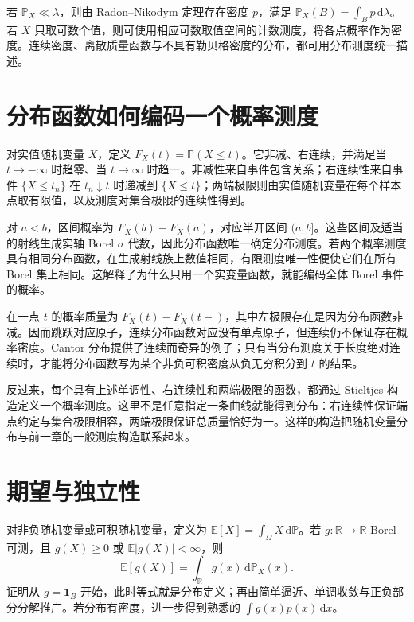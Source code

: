 \documentclass[UTF8,12pt,a4paper,fontset=fandol]{ctexbook}
\begin{document}
若 $\mathbb P_X\ll\lambda$，则由 Radon--Nikodym 定理存在密度 $p$，满足 $\mathbb P_X(B)=\int_Bp\,\mathrm d\lambda$。若 $X$ 只取可数个值，则可使用相应可数取值空间的计数测度，将各点概率作为密度。连续密度、离散质量函数与不具有勒贝格密度的分布，都可用分布测度统一描述。

\section{分布函数如何编码一个概率测度}
对实值随机变量 $X$，定义
$F_X(t)=\mathbb P(X\leq t)$。它非减、右连续，并满足当 $t\to-\infty$ 时趋零、当 $t\to\infty$ 时趋一。非减性来自事件包含关系；右连续性来自事件 $\{X\leq t_n\}$ 在 $t_n\downarrow t$ 时递减到 $\{X\leq t\}$；两端极限则由实值随机变量在每个样本点取有限值，以及测度对集合极限的连续性得到。

对 $a<b$，区间概率为 $F_X(b)-F_X(a)$，对应半开区间 $(a,b]$。这些区间及适当的射线生成实轴 Borel $\sigma$ 代数，因此分布函数唯一确定分布测度。若两个概率测度具有相同分布函数，在生成射线族上数值相同，有限测度唯一性便使它们在所有 Borel 集上相同。这解释了为什么只用一个实变量函数，就能编码全体 Borel 事件的概率。

在一点 $t$ 的概率质量为 $F_X(t)-F_X(t-)$，其中左极限存在是因为分布函数非减。因而跳跃对应原子，连续分布函数对应没有单点原子，但连续仍不保证存在概率密度。Cantor 分布提供了连续而奇异的例子；只有当分布测度关于长度绝对连续时，才能将分布函数写为某个非负可积密度从负无穷积分到 $t$ 的结果。

反过来，每个具有上述单调性、右连续性和两端极限的函数，都通过 Stieltjes 构造定义一个概率测度。这里不是任意指定一条曲线就能得到分布：右连续性保证端点约定与集合极限相容，两端极限保证总质量恰好为一。这样的构造把随机变量分布与前一章的一般测度构造联系起来。

\section{期望与独立性}
对非负随机变量或可积随机变量，定义为 $\mathbb E[X]=\int_\Omega X\,\mathrm d\mathbb P$。若 $g:\mathbb R\to\mathbb R$ Borel 可测，且 $g(X)\geq0$ 或 $\mathbb E|g(X)|<\infty$，则
\begin{equation}
 \mathbb E[g(X)]=\int_{\mathbb R}g(x)\,\mathrm d\mathbb P_X(x).
 \label{eq:mt-distribution-integral}
\end{equation}
证明从 $g=\mathbf1_B$ 开始，此时等式就是分布定义；再由简单逼近、单调收敛与正负部分分解推广。若分布有密度，进一步得到熟悉的 $\int g(x)p(x)\,\mathrm dx$。
\end{document}
